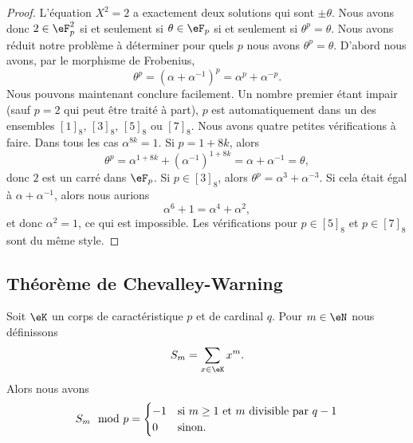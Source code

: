 \begin{proof}
    L'équation \( X^2=2\) a exactement deux solutions qui sont \( \pm\theta\). Nous avons donc \( 2\in \eF_p^2\) si et seulement si \( \theta\in \eF_p\) si et seulement si \( \theta^p=\theta\). Nous avons réduit notre problème à déterminer pour quels \( p\) nous avons \( \theta^p=\theta\). D'abord nous avons, par le morphisme de Frobenius,
    \begin{equation}
        \theta^p=(\alpha+\alpha^{-1})^p=\alpha^p+\alpha^{-p}.
    \end{equation}
    Nous pouvons maintenant conclure facilement. Un nombre premier étant impair (sauf \( p=2\) qui peut être traité à part), \( p\) est automatiquement dans un des ensembles \( [1]_8\), \( [3]_8\), \( [5]_8\) ou \( [7]_8\). Nous avons quatre petites vérifications à faire. Dans tous les cas \( \alpha^{8k}=1\). Si \( p=1+8k\), alors
    \begin{equation}
        \theta^p=\alpha^{1+8k}+(\alpha^{-1})^{1+8k}=\alpha+\alpha^{-1}=\theta,
    \end{equation}
    donc \( 2\) est un carré dans \( \eF_p\). Si \( p\in[3]_8\), alors \( \theta^p=\alpha^3+\alpha^{-3}\). Si cela était égal à \( \alpha+\alpha^{-1}\), alors nous aurions
    \begin{equation}
        \alpha^6+1=\alpha^4+\alpha^2,
    \end{equation}
    et donc \( \alpha^2=1\), ce qui est impossible. Les vérifications pour \( p\in [5]_8\) et \( p\in [7]_8\) sont du même style.

\end{proof}

\subsection{Théorème de Chevalley-Warning}

\begin{lemma}
    Soit \( \eK\) un corps de caractéristique \( p\) et de cardinal \( q\). Pour \( m\in \eN\) nous définissons
    \begin{equation}
        S_m=\sum_{x\in \eK}x^m.
    \end{equation}
    Alors nous avons
    \begin{equation}
        S_m\mod p=\begin{cases}
            -1     &   \text{si \( m\geq 1\) et \( m\) divisible par \( q-1\)}\\
            0    &    \text{sinon}.
        \end{cases}
    \end{equation}
\end{lemma}

